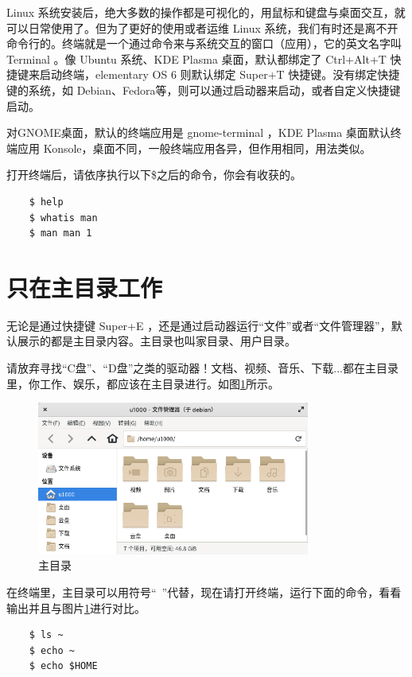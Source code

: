 \par Linux 系统安装后，绝大多数的操作都是可视化的，用鼠标和键盘与桌面交互，就可以日常使用了。但为了更好的使用或者运维 Linux 系统，我们有时还是离不开命令行的。终端就是一个通过命令来与系统交互的窗口（应用），它的英文名字叫 Terminal 。像 Ubuntu 系统、KDE Plasma 桌面，默认都绑定了 Ctrl+Alt+T 快捷键来启动终端，elementary OS 6 则默认绑定 Super+T 快捷键。没有绑定快捷键的系统，如 Debian、Fedora等，则可以通过启动器来启动，或者自定义快捷键启动。
\par 对GNOME桌面，默认的终端应用是 gnome-terminal ，KDE Plasma 桌面默认终端应用 Konsole，桌面不同，一般终端应用各异，但作用相同，用法类似。
\par 打开终端后，请依序执行以下\$之后的命令，你会有收获的。
\begin{lstlisting}
    $ help
    $ whatis man
    $ man man 1
\end{lstlisting}


\section{只在主目录工作}

\par 无论是通过快捷键 Super+E ，还是通过启动器运行“文件”或者“文件管理器”，默认展示的都是主目录内容。主目录也叫家目录、用户目录。
\par 请放弃寻找“C盘”、“D盘”之类的驱动器！文档、视频、音乐、下载...都在主目录里，你工作、娱乐，都应该在主目录进行。如图\ref{fig:2021-10-28_22-31-38}所示。

\begin{figure} [htbp]
	\centering
	\includegraphics [width=0.8\textwidth]{images/ch01/2021-10-28_22-31-38.png}
	\caption{主目录}
	\label{fig:2021-10-28_22-31-38}
\end{figure}

\par 在终端里，主目录可以用符号“~”代替，现在请打开终端，运行下面的命令，看看输出并且与图片\ref{fig:2021-10-28_22-31-38}进行对比。
\begin{lstlisting}
    $ ls ~
    $ echo ~
    $ echo $HOME
\end{lstlisting}


\ifx\all\undefined

\fi
